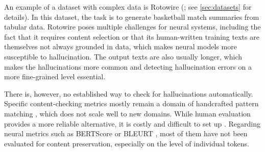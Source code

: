 An example of a dataset with complex data is Rotowire (\citealp{wiseman2017challenges}; see \autoref{sec:datasets} for details). In this dataset, the task is to generate basketball match summaries from tabular data. Rotowire poses multiple challenges for neural systems, including the fact that it requires content selection or that its human-written training texts are themselves not always grounded in data, which makes neural models more susceptible to hallucination.
The output texts are also usually longer, which makes the hallucinations more common and detecting hallucination errors on a more fine-grained level essential.

There is, however, no established way to check for hallucinations automatically. Specific content-checking metrics mostly remain a domain of handcrafted pattern matching \cite{wen2015semantically,dusekSemanticNoiseMatters2019}, which does not scale well to new domains. While human evaluation provides a more reliable alternative, it is costly and difficult to set up \cite{van2019best,belzDisentanglingPropertiesHuman2020,thomsonGoldStandardMethodology2020}. Regarding neural metrics such as BERTScore \cite{zhang2019bertscore} or BLEURT \cite{sellam2020bleurt}, most of them have not been evaluated for content preservation, especially on the level of individual tokens.


